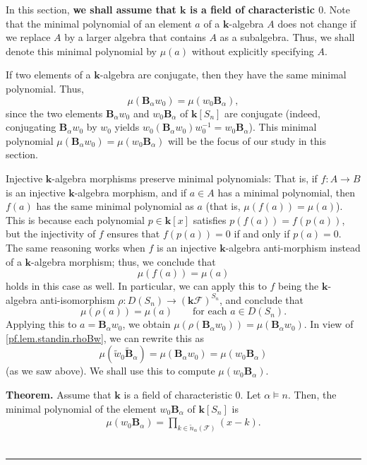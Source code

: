 \documentclass[12pt]{article}
\theoremstyle{definition}%
\newtheorem{thm}{Theorem}[section]
\theoremstyle{definition}%
\theoremstyle{remark}%
\newcommand{\tup}[1]{\left( #1 \right)}
\newcommand{\sbr}[1]{\left[ #1 \right]} %
\newcommand{\kk}{\mathbf{k}}
\newcommand{\ksn}{\kk\left[S_n\right]}
\newcommand{\kf}{\kk\mathcal{F}}
\newcommand{\kfsn}{\left(\kf\right)^{S_n}}
\newcommand{\dsn}{D\left(S_n\right)}
\newcommand{\BBa}{\mathbf{B}_{\alpha}}
\newcommand{\BBta}{\widetilde{\mathbf{B}}_{\alpha}}
\newcommand{\CF}{\mathcal{F}}
\newcommand{\wo}{w_0} %
\newcommand{\wotil}{\widetilde{w}_0}
\newcommand{\nna}{\widetilde{n}_{ \alpha } }%
\newenvironment{thm}[1][Theorem]{\noindent\textbf{#1.} }{\ \rule{0.5em}{0.5em}}
\begin{document}
In this section, \textbf{we shall assume that $\kk$ is a field of
characteristic $0$}. Note that the minimal polynomial of an element
$a$ of a $\kk$-algebra $A$ does not change if we replace $A$
by a larger algebra that contains $A$ as a subalgebra. Thus, we shall denote
this minimal polynomial by $\mu\tup{a}$ without explicitly
specifying $A$.

If two elements of a $\kk$-algebra are conjugate, then they have the
same minimal polynomial. Thus,
\[
\mu\tup{\BBa\wo} = \mu\tup{\wo\BBa} ,
\]
since the two elements $\BBa\wo$ and $\wo\BBa$ of $\ksn$ are conjugate
(indeed, conjugating $\BBa\wo$ by $\wo$ yields
$\wo\tup{\BBa\wo}\wo^{-1} = \wo\BBa$). This minimal polynomial
$\mu\tup{\BBa\wo} = \mu\tup{\wo\BBa}$ will be the focus of our study
in this section.

Injective $\kk$-algebra morphisms preserve minimal polynomials: That
is, if $f:A\to B$ is an injective $\kk$-algebra morphism, and
if $a\in A$ has a minimal polynomial, then
$f\tup{a}$ has the same minimal polynomial as $a$
(that is, $\mu\tup{f\tup{a}}  =\mu\tup{a}$).
This is because each polynomial $p\in
\kk\sbr{x}  $ satisfies $p\tup{f\tup{a}}
= f\tup{p\tup{a}}$, but the injectivity
of $f$ ensures that $f\tup{p\tup{a}} = 0$ if and
only if $p\tup{a} = 0$. The same reasoning works when
$f$ is an injective $\kk$-algebra anti-morphism instead of a
$\kk$-algebra morphism; thus, we conclude that
\begin{equation}
\mu\tup{ f\tup{a} } = \mu\tup{a}
\label{eq.mu.fa=a.antimor}
\end{equation}
holds in this case as well. In particular,
we can apply this to $f$ being the $\kk$-algebra anti-isomorphism
$\rho:\dsn \to \kfsn$, and conclude that
\[
\mu\tup{\rho\tup{a}}
= \mu\tup{a}
\qquad\text{for each } a \in \dsn.
\]
Applying this to $a = \BBa\wo$,
we obtain $\mu\tup{\rho\tup{\BBa\wo}}
= \mu\tup{\BBa\wo}$.
In view of \eqref{pf.lem.standin.rhoBw},
we can rewrite this as
\begin{equation}
\mu\tup{\wotil \BBta}
= \mu\tup{\BBa\wo}
= \mu\tup{\wo\BBa}
\label{eq.minpol.red-to-F}
\end{equation}
(as we saw above).
We shall use this to compute $\mu\tup{\wo\BBa}  $.


\begin{thm}
\label{thm.mp.1}
Assume that $\kk$ is a field of characteristic $0$.
Let $\alpha \models n$.
Then, the minimal polynomial of the element $\wo\BBa$ of $\ksn$ is
\begin{align}
\mu\tup{\wo\BBa}
=
\prod_{k \in \nna\tup{\CF}}\tup{x-k}  .
\label{eq.thm.mp.1.eq}
\end{align}
\end{thm}
\end{document}
